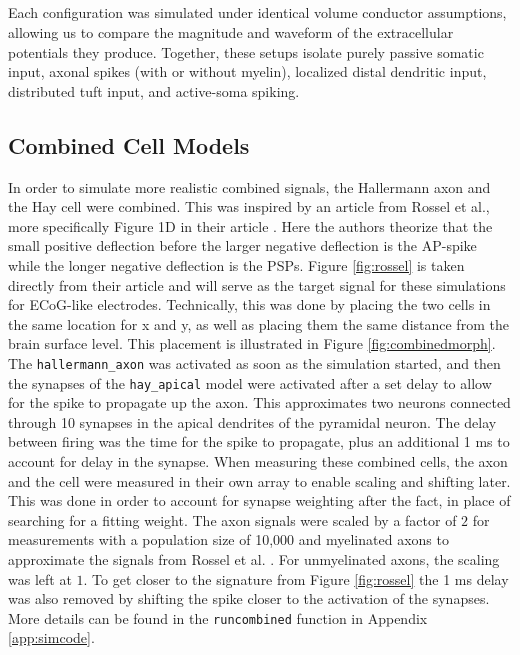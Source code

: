\documentclass[final, a4paper,masters,en,listoffigures,listoftables,norwegiandates]{NMBU}
\begin{document}
\subsection*{}
Each configuration was simulated under identical volume conductor assumptions, allowing us to compare the magnitude and waveform of the extracellular potentials they produce. Together, these setups isolate purely passive somatic input, axonal spikes (with or without myelin), localized distal dendritic input, distributed tuft input, and active-soma spiking.

\subsection{Combined Cell Models} \label{subsubsec:combinedcell}
In order to simulate more realistic combined signals, the Hallermann axon and the Hay cell were combined. This was inspired by an article from Rossel et al., more specifically Figure 1D in their article \cite{ROSSEL2023}. Here the authors theorize that the small positive deflection before the larger negative deflection is the AP-spike while the longer negative deflection is the PSPs. Figure \ref{fig:rossel} is taken directly from their article and will serve as the target signal for these simulations for ECoG-like electrodes. 
Technically, this was done by placing the two cells in the same location for x and y, as well as placing them the same distance from the brain surface level. This placement is illustrated in Figure \ref{fig:combinedmorph}. The \texttt{hallermann\_axon} was activated as soon as the simulation started, and then the synapses of the \texttt{hay\_apical} model were activated after a set delay to allow for the spike to propagate up the axon. This approximates two neurons connected through 10 synapses in the apical dendrites of the pyramidal neuron. The delay between firing was the time for the spike to propagate, plus an additional 1 ms to account for delay in the synapse. When measuring these combined cells, the axon and the cell were measured in their own array to enable scaling and shifting later. This was done in order to account for synapse weighting after the fact, in place of searching for a fitting weight. The axon signals were scaled by a factor of $2$ for measurements with a population size of 10,000 and myelinated axons to approximate the signals from Rossel et al. \cite{ROSSEL2023}. For unmyelinated axons, the scaling was left at $1$. To get closer to the signature from Figure \ref{fig:rossel} the 1 ms delay was also removed by shifting the spike closer to the activation of the synapses. More details can be found in the \texttt{runcombined} function in Appendix \ref{app:simcode}.
\end{document}
